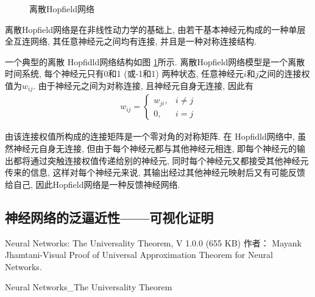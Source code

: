 \begin{figure}[H]
\begin{center}
\caption{离散Hopfield网络}
\label{AI32fig201912022608}
\end{center}
\end{figure}
离散Hopfield网络是在非线性动力学的基础上, 由若干基本神经元构成的一种单层全互连网络, 其任意神经元之间均有连接, 并且是一种对称连接结构.

\begin{example}
一个典型的离散 Hopfidld网络结构如图 \ref{AI32fig201912022608}所示. 离散Hopfield网络模型是一个离散时间系统, 每个神经元只有0和1 (或-1和1) 两种状态, 任意神经元$i$和$j$之间的连接权值为$w_{ij}$. 由于神经元之间为对称连接, 且神经元自身无连接, 因此有
\begin{align}
  w_{i j}=\left\{
  \begin{array}{ll}
  {w_{j i}}, & i \neq j \\
    {0}, &  i=j
    \end{array}\right.
\end{align}
\end{example}
由该连接权值所构成的连接矩阵是一个零对角的对称矩阵. 在 Hopfidld网络中, 虽然神经元自身无连接, 但由于每个神经元都与其他神经元相连, 即每个神经元的输出都将通过突触连接权值传递给别的神经元, 同时每个神经元又都接受其他神经元传来的信息, 这样对每个神经元来说, 其输出经过其他神经元映射后又有可能反馈给自己, 因此Hopfield网络是一种反馈神经网络.

\subsection{神经网络的泛逼近性——可视化证明}
Neural Networks: The Universality Theorem, V 1.0.0 (655 KB) 作者： Mayank Jhamtani-Visual Proof of Universal Approximation Theorem for Neural Networks.

Neural Networks\_The Universality Theorem

